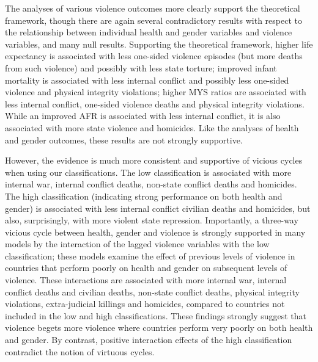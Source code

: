 \documentclass[12pt]{article}
\begin{document}
The analyses of various violence outcomes more clearly support the theoretical framework, though there are again several contradictory results with respect to the relationship between individual health and gender variables and violence variables, and many null results. Supporting the theoretical framework, higher life expectancy is associated with less one-sided violence episodes (but more deaths from such violence) and possibly with less state torture; improved infant mortality is associated with less internal conflict and possibly less one-sided violence and physical integrity violations; higher MYS ratios are associated with less internal conflict, one-sided violence deaths and physical integrity violations. While an improved AFR is associated with less internal conflict, it is also associated with more state violence and homicides. Like the analyses of health and gender outcomes, these results are not strongly supportive.

However, the evidence is much more consistent and supportive of vicious cycles when using our classifications. The low classification is associated with more internal war, internal conflict deaths, non-state conflict deaths and homicides. The high classification (indicating strong performance on both health and gender) is associated with less internal conflict civilian deaths and homicides, but also, surprisingly, with more violent state repression. Importantly, a three-way vicious cycle between health, gender and violence is strongly supported in many models by the interaction of the lagged violence variables with the low classification; these models examine the effect of previous levels of violence in countries that perform poorly on health and gender on subsequent levels of violence. These interactions are associated with more internal war, internal conflict deaths and civilian deaths, non-state conflict deaths, physical integrity violations, extra-judicial killings and homicides, compared to countries not included in the low and high classifications. These findings strongly suggest that violence begets more violence where countries perform very poorly on both health and gender. By contrast, positive interaction effects of the high classification contradict the notion of virtuous cycles.
\end{document}
